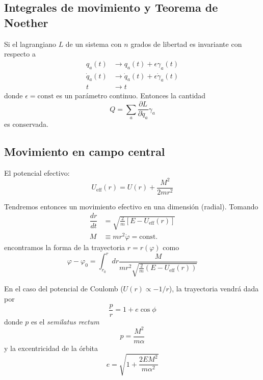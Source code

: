 \documentclass[]{report}
\numberwithin{equation}{section}
\newcommand{\0}{\textcolor{gray}{0}}
\newcommand{\eff}[1]{#1_\mathrm{eff}}
\newcommand{\Ueff}{\eff{U}}
\newcommand{\td}[2]{\dfrac{d #1}{d #2}}
\begin{document}
\subsection{Integrales de movimiento y Teorema de Noether}
Si el lagrangiano \(L\) de un sistema con \(n\) grados de libertad es invariante con respecto a
\begin{align*}
	q_a(t) &\rightarrow q_a(t) + \epsilon\gamma_a(t)\\
	\dot{q}_a(t) &\rightarrow \dot{q}_a(t) + \epsilon\dot{\gamma}_a(t)\\
	t &\rightarrow t
\end{align*}
donde \(\epsilon = \mathrm{const}\) es un parámetro continuo. Entonces la cantidad
\begin{equation}
	Q = \sum_{a}\frac{\partial L}{\partial \dot{q}_a}\gamma_a
\end{equation}
es conservada.

\subsection{Movimiento en campo central}
El potencial efectivo:
\begin{equation}
	\Ueff(r) = U(r) + \frac{M^2}{2 m r^2}
\end{equation}

Tendremos entonces un movimiento efectivo en una dimensión (radial). Tomando
\begin{align}
	\td{r}{t} &= \sqrt{\frac{2}{m} \left[E - U_\mathrm{eff}(r)\right]}\\
	M &\equiv m r^2 \dot{\varphi} = \mathrm{const.}
\end{align}
encontramos la forma de la trayectoria \(r = r(\varphi)\) como
\begin{equation}
	\varphi - \varphi_0 = \int_{r_0}^{r} dr \frac{M}{m r^2 \sqrt{\frac{2}{m} \left(E - U_\mathrm{eff}(r)\right)}}
\end{equation}

En el caso del potencial de Coulomb (\(U(r) \propto -1/r\)), la trayectoria vendrá dada por
\begin{equation}
	\frac{p}{r} = 1 + e \cos \phi
\end{equation}
donde \(p\) es el \textit{semilatus rectum}
\begin{equation}
	p = \frac{M^2}{m\alpha}
\end{equation}
y la excentricidad de la órbita
\begin{equation}
	e = \sqrt{1 + \frac{2 E M^2}{m \alpha^2}}
\end{equation}
\end{document}
